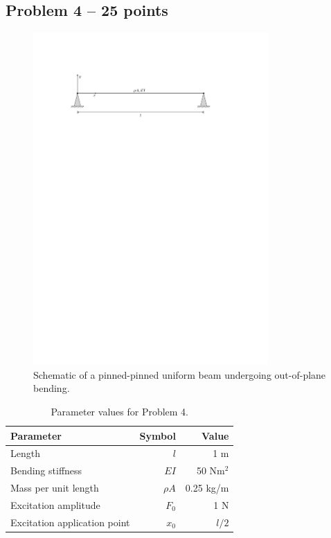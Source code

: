 \documentclass[11pt,a4paper]{article}
\begin{document}
\clearpage 

\subsection*{Problem 4 -- 25 points}

\begin{figure}[htpt!]
	\centering
	\includegraphics[width=0.8\textwidth]{figures/beam3.pdf}
	\caption{Schematic of a pinned-pinned uniform beam undergoing out-of-plane bending.}
	\label{f3}
\end{figure}
%
\begin{table}[htpt!]
	\centering
	\caption{Parameter values for Problem 4. \label{t3}}
	\vspace{2mm}
	\begin{tabular}{lrr}
		\toprule
		Parameter & Symbol & Value \\
		\midrule 
		Length & $l$ & 1 m \\
		Bending stiffness & $EI$ & 50 Nm$^2$\\
		Mass per unit length & $\rho A$ & 0.25 kg/m\\
		Excitation amplitude & $F_0$ & 1 N\\
		Excitation application point & $x_0$ & $l/2$ \\
		\bottomrule
	\end{tabular}
\end{table}
\end{document}
